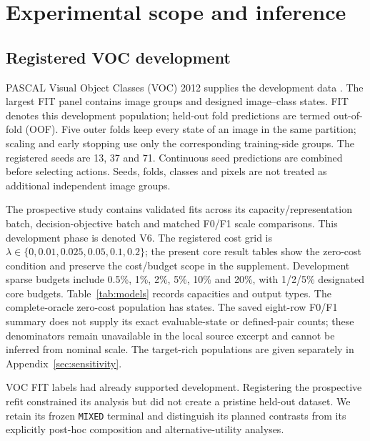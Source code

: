 \section{Experimental scope and inference}
\label{sec:experiments}

\subsection{Registered VOC development}
PASCAL Visual Object Classes (VOC) 2012 supplies the development data
\citep{pascal-voc-2012}. The largest
FIT panel contains  image groups and
 designed image--class states. FIT denotes this
development population; held-out fold predictions are termed out-of-fold
(OOF). Five outer folds keep every
state of an image in the same partition; scaling and early stopping use
only the corresponding training-side groups. The registered seeds are 13,
37 and 71. Continuous seed predictions are combined before selecting
actions. Seeds, folds, classes and pixels are not treated as additional
independent image groups.

The prospective study contains  validated fits across its
capacity/representation batch, decision-objective batch and matched
F0/F1 scale comparisons. This development phase is denoted V6. The
registered cost grid is $\lambda\in\{0,0.01,0.025,0.05,0.1,0.2\}$;
the present core result tables show the zero-cost condition and preserve
the cost/budget scope in the supplement. Development sparse budgets include
0.5\%, 1\%, 2\%, 5\%, 10\% and 20\%, with 1/2/5\% designated core
budgets. Table~\ref{tab:models} records capacities and output types.
The complete-oracle zero-cost population has  states.
The saved eight-row F0/F1 summary does not supply its exact evaluable-state
or defined-pair counts; these denominators remain unavailable in the local
source excerpt and cannot be inferred from nominal scale. The target-rich
populations are given separately in Appendix~\ref{sec:sensitivity}.

VOC FIT labels had already supported development. Registering the prospective
refit constrained its analysis but did not create a pristine held-out
dataset. We retain its frozen \texttt{MIXED} terminal and distinguish
its planned contrasts from its explicitly post-hoc composition and
alternative-utility analyses.


